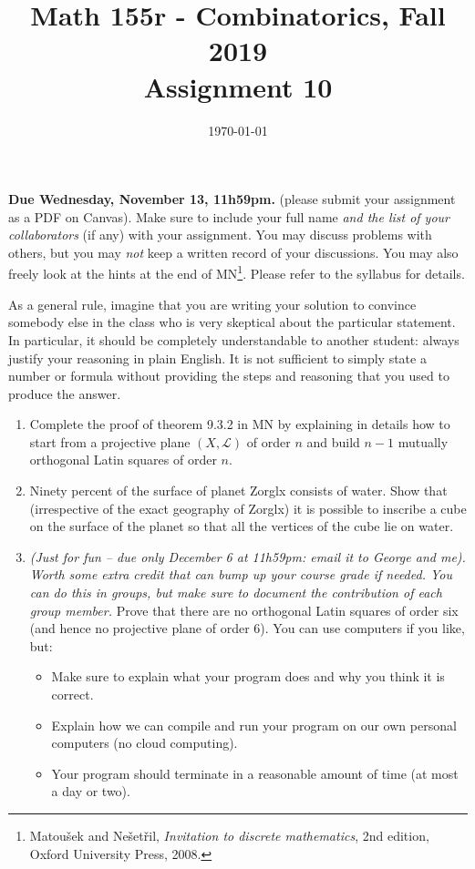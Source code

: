 \documentclass{amsart}
\title[Math 155r, Fall 2019: assignment 10]{Math 155r - Combinatorics, Fall 2019 \\ Assignment 10}
\date{\today}
\theoremstyle{definition}
\newcommand{\Ls}{\mathcal{L}}
\begin{document}

\vspace*{-10em}
\maketitle

\textbf{Due Wednesday, November 13, 11h59pm.} (please submit your assignment as a PDF on Canvas). Make sure to include your full name \emph{and the list of your collaborators} (if any) with your assignment. You may discuss problems with others, but you may \emph{not} keep a written record of your discussions. You may also freely look at the hints at the end of MN\footnote{Matoušek and Nešetřil, \emph{Invitation to discrete mathematics}, 2nd edition, Oxford University Press, 2008.}. Please refer to the syllabus for details.

As a general rule, imagine that you are writing your solution to convince somebody else in the class who is very skeptical about the particular statement. In particular, it should be completely understandable to another student: always justify your reasoning in plain English. It is not sufficient to simply state a number or formula without providing the steps and reasoning that you used to produce the answer.

\begin{enumerate}
\item Complete the proof of theorem 9.3.2 in MN by explaining in details how to start from a projective plane $(X, \Ls)$ of order $n$ and build $n - 1$ mutually orthogonal Latin squares of order $n$.
\item Ninety percent of the surface of planet Zorglx consists of water. Show that (irrespective of the exact geography of Zorglx) it is possible to inscribe a cube on the surface of the planet so that all the vertices of the cube lie on water.
\item \emph{(Just for fun -- due only December 6 at 11h59pm: email it to George and me). Worth some extra credit that can bump up your course grade if needed. You can do this in groups, but make sure to document the contribution of each group member.} Prove that there are no orthogonal Latin squares of order six (and hence no projective plane of order 6). You can use computers if you like, but:

  \begin{itemize}
  \item Make sure to explain what your program does and why you think it is correct.
  \item Explain how we can compile and run your program on our own personal computers (no cloud computing).
  \item Your program should terminate in a reasonable amount of time (at most a day or two).
  \end{itemize}
\end{enumerate}
\end{document}
